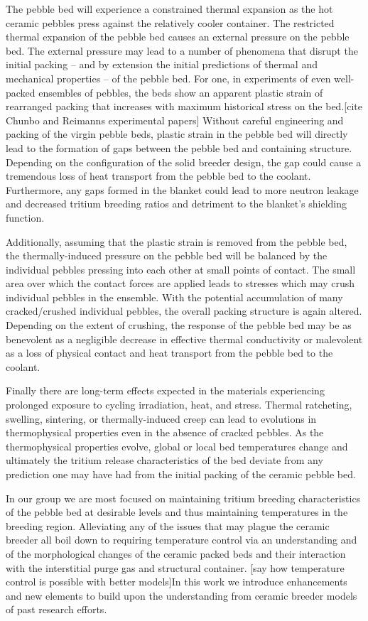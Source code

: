 The pebble bed will experience a constrained thermal expansion as the hot ceramic pebbles press against the relatively cooler container. The restricted thermal expansion of the pebble bed causes an external pressure on the pebble bed. The external pressure may lead to a number of phenomena that disrupt the initial packing -- and by extension the initial predictions of thermal and mechanical properties -- of the pebble bed. For one, in experiments of even well-packed ensembles of pebbles, the beds show an apparent plastic strain of rearranged packing that increases with maximum historical stress on the bed.[cite Chunbo and Reimanns experimental papers] Without careful engineering and packing of the virgin pebble beds, plastic strain in the pebble bed will directly lead to the formation of gaps between the pebble bed and containing structure. Depending on the configuration of the solid breeder design, the gap could cause a tremendous loss of heat transport from the pebble bed to the coolant. Furthermore, any gaps formed in the blanket could lead to more neutron leakage and decreased tritium breeding ratios and detriment to the blanket's shielding function.

Additionally, assuming that the plastic strain is removed from the pebble bed, the thermally-induced pressure on the pebble bed will be balanced by the individual pebbles pressing into each other at small points of contact. The small area over which the contact forces are applied leads to stresses which may crush individual pebbles in the ensemble. With the potential accumulation of many cracked/crushed individual pebbles, the overall packing structure is again altered. Depending on the extent of crushing, the response of the pebble bed may be as benevolent as a negligible decrease in effective thermal conductivity or malevolent as a loss of physical contact and heat transport from the pebble bed to the coolant. 

Finally there are long-term effects expected in the materials experiencing prolonged exposure to cycling irradiation, heat, and stress. Thermal ratcheting, swelling, sintering, or thermally-induced creep can lead to evolutions in thermophysical properties even in the absence of cracked pebbles. As the thermophysical properties evolve, global or local bed temperatures change and ultimately the tritium release characteristics of the bed deviate from any prediction one may have had from the initial packing of the ceramic pebble bed. 

In our group we are most focused on maintaining tritium breeding characteristics of the pebble bed at desirable levels and thus maintaining temperatures in the breeding region. Alleviating any of the issues that may plague the ceramic breeder all boil down to requiring temperature control via an understanding and of the morphological changes of the ceramic packed beds and their interaction with the interstitial purge gas and structural container. [say how temperature control is possible with better models]In this work we introduce enhancements and new elements to build upon the understanding from ceramic breeder models of past research efforts. 







